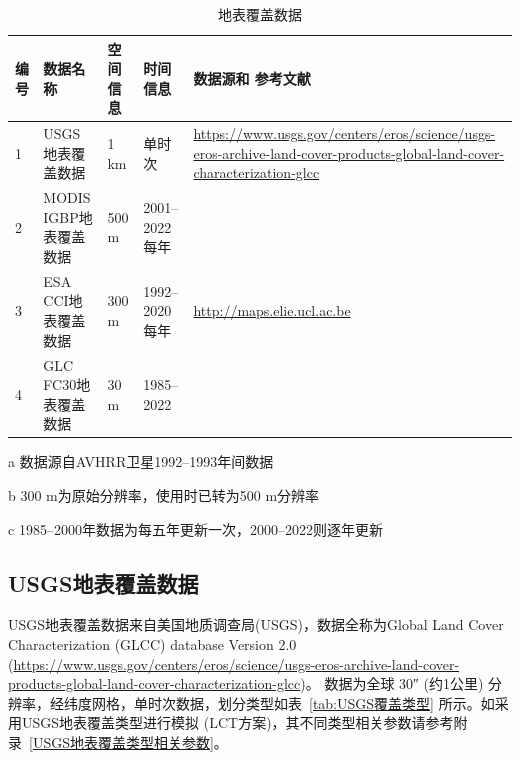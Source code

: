 \begin{table}[htbp]
  \begin{threeparttable}
    \centering
    \caption{地表覆盖数据}
    \label{tab:地表覆盖数据}
    \begin{tabular}{p{1cm}p{4.5cm}p{2cm}p{3cm}p{3cm}}
      \toprule
      编号 & 数据名称               & 空间信息       & 时间信息            & 数据源和 \newline 参考文献                                                                                                    \\
      \midrule
      1    & USGS地表覆盖数据       & 1 km           & 单时次\tnote{a}     & \url{https://www.usgs.gov/centers/eros/science/usgs-eros-archive-land-cover-products-global-land-cover-characterization-glcc} \\
      2    & MODIS IGBP地表覆盖数据 & 500 m          & 2001--2022每年      & \cite{Friedl2019}                                                                                                             \\
      3    & ESA CCI地表覆盖数据    & 300 m\tnote{b} & 1992--2020每年      & \url{http://maps.elie.ucl.ac.be}                                                                                              \\
      4    & GLC FC30地表覆盖数据   & 30 m           & 1985--2022\tnote{c} & \cite{zhang2023glc_fcs30d}                                                                                                    \\
      \bottomrule
    \end{tabular}
    \begin{tablenotes}
    \item [a] 数据源自AVHRR卫星1992--1993年间数据
    \item [b] 300 m为原始分辨率，使用时已转为500 m分辨率
    \item [c] 1985--2000年数据为每五年更新一次，2000--2022则逐年更新
    \end{tablenotes}
  \end{threeparttable}
\end{table}

\subsection{USGS地表覆盖数据}\label{USGS地表覆盖数据}
USGS地表覆盖数据来自美国地质调查局(USGS)，数据全称为Global Land Cover Characterization (GLCC) database Version 2.0
(\url{https://www.usgs.gov/centers/eros/science/usgs-eros-archive-land-cover-products-global-land-cover-characterization-glcc})。
数据为全球 \ang{;;30} (约1公里) 分辨率，经纬度网格，单时次数据，划分类型如表~\ref{tab:USGS覆盖类型} 所示。如采用USGS地表覆盖类型进行模拟 (LCT方案)，其不同类型相关参数请参考附录~\ref{USGS地表覆盖类型相关参数}。

